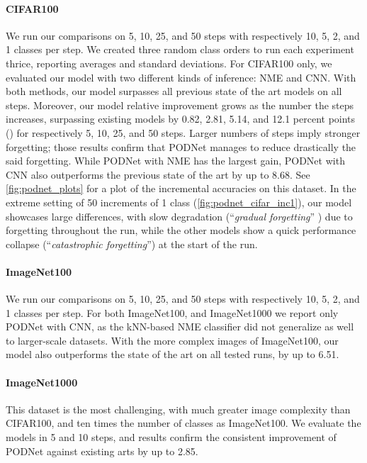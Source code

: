 \paragraph{CIFAR100} We run our comparisons on 5, 10, 25, and 50 steps with respectively 10, 5, 2,
and 1 classes per step. We created three random class orders to run each experiment thrice,
reporting averages and standard deviations. For CIFAR100 only, we evaluated our model with two
different kinds of inference: \ac{NME} and CNN. With both methods, our model surpasses all previous
state of the art models on all steps. Moreover, our model relative improvement grows as the number
the steps increases, surpassing existing models by 0.82, 2.81, 5.14, and 12.1 percent points (\pp)
for respectively 5, 10, 25, and 50 steps. Larger numbers of steps imply  stronger forgetting; those
results confirm that \ac{PODNet} manages to reduce drastically the said forgetting. While
\ac{PODNet} with \ac{NME} has the largest gain, \ac{PODNet} with CNN also outperforms the previous
state of the art by up to 8.68\pp. See \autoref{fig:podnet_plots} for a plot of the incremental
accuracies on this dataset. In the extreme setting of 50 increments of 1 class
(\autoref{fig:podnet_cifar_inc1}), our model showcases large differences, with slow degradation
(``\textit{gradual forgetting}'' \citep{french1999catastrophicforgetting}) due to forgetting
throughout the run, while the other models show a quick performance collapse (``\textit{catastrophic
    forgetting}'') at the start of the run.

\paragraph{ImageNet100} We run our comparisons on 5, 10, 25, and 50 steps with respectively 10, 5,
2, and 1 classes per step. For both ImageNet100, and ImageNet1000 we report only \ac{PODNet} with CNN, as
the kNN-based \ac{NME} classifier did not generalize as well to larger-scale datasets. With the more
complex images of ImageNet100, our model also outperforms the state of the art on all tested runs,
by up to 6.51\pp.

\paragraph{ImageNet1000} This dataset is the most challenging, with much greater image complexity
than CIFAR100, and ten times the number of classes as ImageNet100. We evaluate the models in 5 and
10 steps, and results confirm the consistent improvement of \ac{PODNet} against existing arts by up to
2.85\pp.

